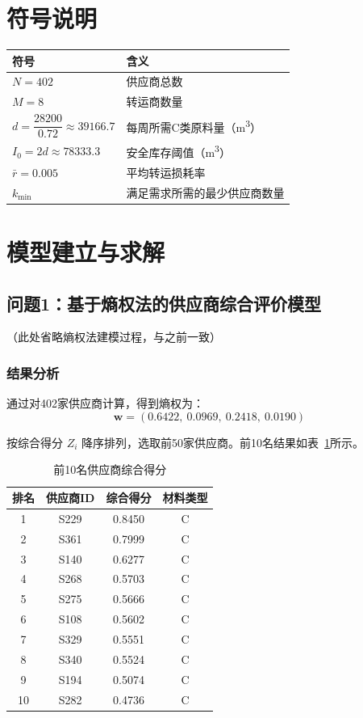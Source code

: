 \documentclass[12pt]{article}
\begin{document}
\section{符号说明}
\begin{table}[htbp]
\centering
\begin{tabular}{>{\raggedright\arraybackslash}p{3cm}p{10cm}}
\toprule
符号 & 含义 \\
\midrule
$N = 402$ & 供应商总数 \\
$M = 8$ & 转运商数量 \\
$d = \dfrac{28200}{0.72} \approx \num{39166.7}$ & 每周所需C类原料量（\si{\cubic\meter}） \\
$I_0 = 2d \approx \num{78333.3}$ & 安全库存阈值（\si{\cubic\meter}） \\
$\bar{r} = 0.005$ & 平均转运损耗率 \\
$k_{\min}$ & 满足需求所需的最少供应商数量 \\
\bottomrule
\end{tabular}
\end{table}

\section{模型建立与求解}

\subsection{问题1：基于熵权法的供应商综合评价模型}

（此处省略熵权法建模过程，与之前一致）

\subsubsection*{结果分析}

通过对402家供应商计算，得到熵权为：
\[
\mathbf{w} = (0.6422,\ 0.0969,\ 0.2418,\ 0.0190)
\]

按综合得分 $Z_i$ 降序排列，选取前50家供应商。前10名结果如表~\ref{tab:top10}所示。

\begin{table}[htbp]
\centering
\caption{前10名供应商综合得分}
\label{tab:top10}
\begin{tabular}{cccc}
\toprule
排名 & 供应商ID & 综合得分 & 材料类型 \\
\midrule
1 & S229 & 0.8450 & C \\
2 & S361 & 0.7999 & C \\
3 & S140 & 0.6277 & C \\
4 & S268 & 0.5703 & C \\
5 & S275 & 0.5666 & C \\
6 & S108 & 0.5602 & C \\
7 & S329 & 0.5551 & C \\
8 & S340 & 0.5524 & C \\
9 & S194 & 0.5074 & C \\
10& S282 & 0.4736 & C \\
\bottomrule
\end{tabular}
\end{table}
\end{document}
